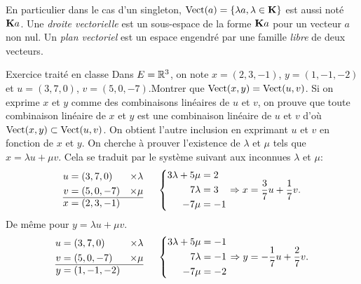 \begin{rem}
 En particulier dans le cas d'un singleton, $\mathop{\mathrm{Vect}}(a)=\{\lambda a, \lambda\in \mathbf{K}\}$ est aussi noté $\mathbf{K} a$. Une \emph{droite vectorielle} est un sous-espace de la forme $\mathbf{K} a$ pour un vecteur $a$ non nul. Un \emph{plan vectoriel} est un espace engendré par une famille \emph{libre} de deux vecteurs.
\end{rem}
Exercice traité en classe\newline
Dans $E=\mathbb{R}^3$, on note $x=(2,3,-1)$, $y=(1,-1,-2)$  et $u=(3,7,0)$, $v=(5,0,-7)$.\newline Montrer que $\mathop{\mathrm{Vect}}(x,y)=\mathop{\mathrm{Vect}}(u,v)$.\newline
Si on exprime $x$ et $y$ comme des combinaisons linéaires de $u$ et $v$, on prouve que toute combinaison linéaire de $x$ et $y$ est une combinaison linéaire de $u$ et $v$ d'où $\mathop{\mathrm{Vect}}(x,y)\subset \mathop{\mathrm{Vect}}(u,v)$. On obtient l'autre inclusion en exprimant $u$ et $v$ en fonction de $x$ et $y$.\newline
On cherche à prouver l'existence de $\lambda$ et $\mu$ tels que $x=\lambda u + \mu v$. Cela se traduit par le système suivant aux inconnues $\lambda$ et $\mu$:
\[
  \begin{aligned}
    u &= (3,7,0)  &\times \lambda \\
    v &= (5,0,-7) &\times \mu\\ \hline
    x &= (2,3,-1)&
  \end{aligned}
\hspace{0.5cm}
\left\lbrace
\begin{aligned}
  3\lambda + 5 \mu &= 2\\
  7\lambda &= 3\\
  -7\mu &= -1
\end{aligned}
\right. \Rightarrow x = \frac{3}{7}u + \frac{1}{7}v.
\]
De même pour $y = \lambda u + \mu v$.
\[
  \begin{aligned}
    u &= (3,7,0)  &\times \lambda \\
    v &= (5,0,-7) &\times \mu\\ \hline
    y &= (1,-1,-2)&
  \end{aligned}
\hspace{0.5cm}
\left\lbrace
\begin{aligned}
  3\lambda + 5 \mu &= -1\\
  7\lambda &= -1\\
  -7\mu &= -2
\end{aligned}
\right. \Rightarrow y = -\frac{1}{7}u + \frac{2}{7}v.
\]
